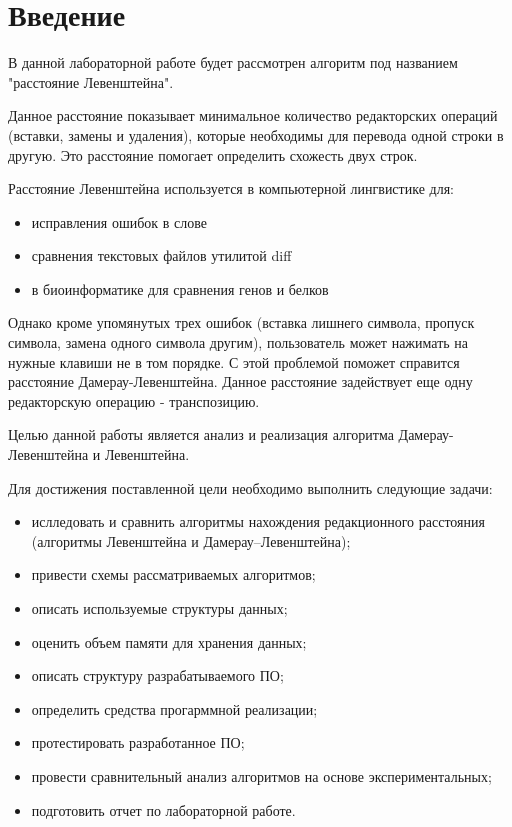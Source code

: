 \chapter*{Введение}

В данной лабораторной работе будет рассмотрен алгоритм под названием "расстояние Левенштейна". 

Данное расстояние показывает минимальное количество редакторских операций (вставки, замены и удаления), которые необходимы для перевода одной строки в другую. Это расстояние помогает определить схожесть двух строк.  

Расстояние Левенштейна используется в компьютерной лингвистике для:
\begin{itemize}
	\item исправления ошибок в слове
	\item сравнения текстовых файлов утилитой diff
	\item в биоинформатике для сравнения генов и белков
\end{itemize}

Однако кроме упомянутых трех ошибок (вставка лишнего символа, пропуск символа, замена одного символа другим), пользователь может нажимать на нужные клавиши не в том порядке. С этой проблемой поможет справится расстояние Дамерау-Левенштейна. Данное расстояние задействует еще одну редакторскую операцию - транспозицию.

Целью данной работы является анализ и реализация алгоритма Дамерау-Левенштейна и Левенштейна.  
\newline


Для достижения поставленной цели необходимо выполнить следующие задачи:
\begin{itemize}
    \item ислледовать и сравнить алгоритмы нахождения редакционного расстояния (алгоритмы Левенштейна и Дамерау--Левенштейна);
    \item привести схемы рассматриваемых алгоритмов;
    \item описать используемые структуры данных;
    \item оценить объем памяти для хранения данных;
    \item описать структуру разрабатываемого ПО;
    \item определить средства прогарммной реализации;
    \item протестировать разработанное ПО;
    \item провести сравнительный анализ алгоритмов на основе экспериментальных;
	\item подготовить отчет по лабораторной работе.
\end{itemize}
